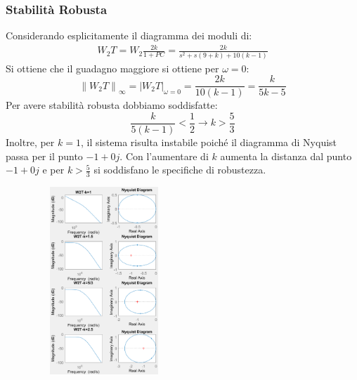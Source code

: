 \documentclass{beamer}
\begin{document}
\begin{frame}
	\frametitle{Stabilità Robusta}
	\footnotesize
	\begin{minipage}{0.45\textwidth}
		Considerando esplicitamente il diagramma dei moduli di:
		\begin{align*}
			W_{2}T = W_{2}\frac{2k}{1+PC}=\frac{2k}{s^{2}+s(9+k)+10(k-1)}
		\end{align*}
		Si ottiene che il guadagno maggiore si ottiene per \(\omega = 0\):
		\begin{equation*}
			\left\lVert W_{2}T\right\rVert_{\infty}=|W_{2}T|_{\omega =0}= \frac{2k}{10(k-1)}=\frac{k}{5k-5}
		\end{equation*}
		Per avere stabilità robusta dobbiamo soddisfatte:\begin{equation*}
			\frac{k}{5(k-1)}<\frac{1}{2}\rightarrow k>\frac{5}{3}
		\end{equation*}
		Inoltre, per \(k=1\), il sistema risulta instabile poiché il diagramma di Nyquist passa per il punto \(-1+0j\). Con l'aumentare di \(k\) aumenta la distanza dal punto \(-1+0j\) e per \( k>\frac{5}{3}\) si soddisfano le specifiche di robustezza.
	\end{minipage}\hspace{1cm}
	\begin{minipage}{0.45\textwidth}
		\begin{figure}
			\centering
			\includegraphics[width=150pt,height=200pt]{2022-06-09-16-40-44.png}%
		\end{figure}
	\end{minipage}

\end{frame}
\end{document}
